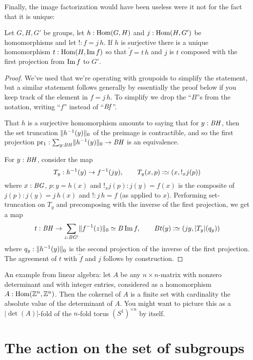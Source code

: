 Finally, the image factorization would have been useless were it not for the fact that it is unique:
\begin{lemma}
  \label{lem:uniquenessofimagefactorizationforgroups}
  Let $G,H,G'$ be groups, let $h:\Hom(G,H)$ and $j:\Hom(H,G')$ be homomorphisms and let $!:f=j\,h$.  If $h$ is surjective there is a unique homomorphism $t:\Hom(H,\image f)$ so that $\tilde f=t\, h$ and $j$ is $t$ composed with the first projection from $\image f$ to $ G'$.
\end{lemma}
\begin{proof}
  We've used that we're operating with groupoids to simplify the statement, but a similar statement follows generally by essentially the proof below if you keep track of the element in $f=j\,h$.  To simplify we drop the ``$B$''s from the notation, writing ``$f$'' instead of ``$\mathit{B}\mathit{f}$''.  

That $h$ is a surjective homomorphism amounts to saying that for $y:\mathit{B}\mathit{H}$, then the set truncation $\lVert h^{-1}(y)\rVert_0$ of the preimage is contractible, and so the first projection $\mathrm{pr_1}:\sum_{y:\mathit{B}\mathit{H}}\lVert h^{-1}(y)\rVert_0\to \mathit{B}\mathit{H}$ is an equivalence.

For $y:\mathit{B}\mathit{H}$, consider the map 
$$T_y:h^{-1}(y)\to f^{-1}(j y),\qquad T_y(x,p)\defequi (x,!_xj(p))$$ where $x:\mathit{B}\mathit{G}$, $p:y=h(x)$ and $!_xj(p):j(y)=f(x)$ is the composite of $j(p):j(y)=j\,h(x)$ and $!:j\,h=f$ (as applied to $x$).  Performing set-truncation on $T_y$ and precomposing with the inverse of the first projection, we get a map
$$t:\BH%
\to\sum_{z:\BG'}\Trunc{f^{-1}(z)}_0\oldequiv B\image f,\qquad Bt(y)\defequi(jy,|T_y|(q_y))$$
where $q_y:\lVert h^{-1}(y)\rVert_0$ is the second projection of the inverse of the first projection.  The agreement of $t$ with $\tilde f$ and $j$ follows by construction.
\end{proof}

\begin{example}
  An example from linear algebra: let $A$ be any $n\times n$-matrix with nonzero determinant and with integer entries, considered as a homomorphism $A:\Hom(\ZZ^n,\ZZ^n)$.  Then the cokernel of $A$ is a finite set with cardinality the absolute value of the determinant of $A$.  You might want to picture this as a $|\det(A)|$-fold \covering of the $n$-fold torus $(S^1)^{\times n}$ by itself.
\end{example}


      \section{The action on the set of subgroups}
\label{sec:actiononsub}

